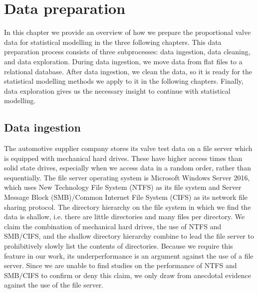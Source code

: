 \chapter{Data preparation}

In this chapter we provide an overview of how we prepare the proportional valve data for statistical modelling in the three following chapters.
This data preparation process consists of three subprocesses: data ingestion, data cleaning, and data exploration.
During data ingestion, we move data from flat files to a relational database.
After data ingestion, we clean the data, so it is ready for the statistical modelling methods we apply to it in the following chapters.
Finally, data exploration gives us the necessary insight to continue with statistical modelling.

\section{Data ingestion}

The automotive supplier company stores its valve test data on a file server which is equipped with mechanical hard drives.
These have higher access times than solid state drives, especially when we access data in a random order, rather than sequentially.
The file server operating system is Microsoft Windows Server 2016, which uses New Technology File System (NTFS) as its file system and Server Message Block (SMB)/Common Internet File System (CIFS) as its network file sharing protocol.
The directory hierarchy on the file system in which we find the data is shallow, i.e. there are little directories and many files per directory.
We claim the combination of mechanical hard drives, the use of NTFS and SMB/CIFS, and the shallow directory hierarchy combine to lead the file server to prohibitively slowly list the contents of directories.
Because we require this feature in our work, its underperformance is an argument against the use of a file server.
Since we are unable to find studies on the performance of NTFS and SMB/CIFS to confirm or deny this claim, we only draw from anecdotal evidence against the use of the file server.

